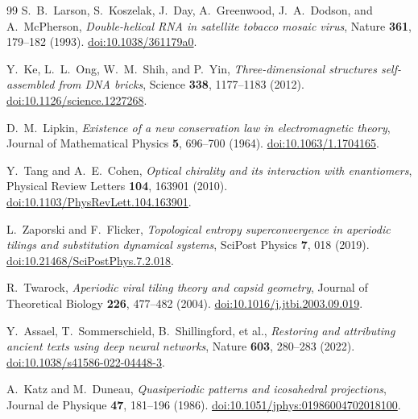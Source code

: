 \documentclass[11pt,a4paper]{article}
\theoremstyle{definition}
\begin{document}
\begin{thebibliography}{99}
S.~B.~Larson, S.~Koszelak, J.~Day, A.~Greenwood, J.~A.~Dodson, and A.~McPherson, \textit{Double-helical RNA in satellite tobacco mosaic virus}, Nature \textbf{361}, 179--182 (1993). \href{https://doi.org/10.1038/361179a0}{doi:10.1038/361179a0}.

Y.~Ke, L.~L.~Ong, W.~M.~Shih, and P.~Yin, \textit{Three-dimensional structures self-assembled from DNA bricks}, Science \textbf{338}, 1177--1183 (2012). \href{https://doi.org/10.1126/science.1227268}{doi:10.1126/science.1227268}.

D.~M.~Lipkin, \textit{Existence of a new conservation law in electromagnetic theory}, Journal of Mathematical Physics \textbf{5}, 696--700 (1964). \href{https://doi.org/10.1063/1.1704165}{doi:10.1063/1.1704165}.

Y.~Tang and A.~E.~Cohen, \textit{Optical chirality and its interaction with enantiomers}, Physical Review Letters \textbf{104}, 163901 (2010). \href{https://doi.org/10.1103/PhysRevLett.104.163901}{doi:10.1103/PhysRevLett.104.163901}.

L.~Zaporski and F.~Flicker, \textit{Topological entropy superconvergence in aperiodic tilings and substitution dynamical systems}, SciPost Physics \textbf{7}, 018 (2019). \href{https://doi.org/10.21468/SciPostPhys.7.2.018}{doi:10.21468/SciPostPhys.7.2.018}.

R.~Twarock, \textit{Aperiodic viral tiling theory and capsid geometry}, Journal of Theoretical Biology \textbf{226}, 477--482 (2004). \href{https://doi.org/10.1016/j.jtbi.2003.09.019}{doi:10.1016/j.jtbi.2003.09.019}.

Y.~Assael, T.~Sommerschield, B.~Shillingford, et al., \textit{Restoring and attributing ancient texts using deep neural networks}, Nature \textbf{603}, 280--283 (2022). \href{https://doi.org/10.1038/s41586-022-04448-3}{doi:10.1038/s41586-022-04448-3}.

A.~Katz and M.~Duneau, \textit{Quasiperiodic patterns and icosahedral projections}, Journal de Physique \textbf{47}, 181--196 (1986). \href{https://doi.org/10.1051/jphys:01986004702018100}{doi:10.1051/jphys:01986004702018100}.

\end{thebibliography}
\end{document}
